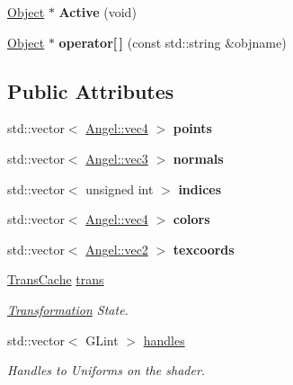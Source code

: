 \begin{DoxyCompactItemize}
\item 
\hypertarget{class_scene_a50f6c9e9aa2e243da5e86bf3470c809e}{\hyperlink{class_object}{Object} $\ast$ {\bfseries Active} (void)}\label{class_scene_a50f6c9e9aa2e243da5e86bf3470c809e}

\item 
\hypertarget{class_scene_ae9b69d8db8a46991017635f22e45baad}{\hyperlink{class_object}{Object} $\ast$ {\bfseries operator\mbox{[}$\,$\mbox{]}} (const std\-::string \&objname)}\label{class_scene_ae9b69d8db8a46991017635f22e45baad}

\end{DoxyCompactItemize}
\subsection*{Public Attributes}
\begin{DoxyCompactItemize}
\item 
\hypertarget{class_object_a8dec70177d147f59ba10c9eba8e9191b}{std\-::vector$<$ \hyperlink{struct_angel_1_1vec4}{Angel\-::vec4} $>$ {\bfseries points}}\label{class_object_a8dec70177d147f59ba10c9eba8e9191b}

\item 
\hypertarget{class_object_ad541a7bb180e24f59d752cc6d7f8c7e8}{std\-::vector$<$ \hyperlink{struct_angel_1_1vec3}{Angel\-::vec3} $>$ {\bfseries normals}}\label{class_object_ad541a7bb180e24f59d752cc6d7f8c7e8}

\item 
\hypertarget{class_object_a9b2fb19d129ad79407f9af0eea05b96c}{std\-::vector$<$ unsigned int $>$ {\bfseries indices}}\label{class_object_a9b2fb19d129ad79407f9af0eea05b96c}

\item 
\hypertarget{class_object_a4de4c1e2c4b621efb6f5d1b398ac6835}{std\-::vector$<$ \hyperlink{struct_angel_1_1vec4}{Angel\-::vec4} $>$ {\bfseries colors}}\label{class_object_a4de4c1e2c4b621efb6f5d1b398ac6835}

\item 
\hypertarget{class_object_a6d6c58ccb93f7a2bd7439d081134aaa0}{std\-::vector$<$ \hyperlink{struct_angel_1_1vec2}{Angel\-::vec2} $>$ {\bfseries texcoords}}\label{class_object_a6d6c58ccb93f7a2bd7439d081134aaa0}

\item 
\hypertarget{class_object_a1bb011587e4fa6e69984d5679546b1cb}{\hyperlink{class_trans_cache}{Trans\-Cache} \hyperlink{class_object_a1bb011587e4fa6e69984d5679546b1cb}{trans}}\label{class_object_a1bb011587e4fa6e69984d5679546b1cb}

\begin{DoxyCompactList}\small\item\em \hyperlink{class_transformation}{Transformation} State. \end{DoxyCompactList}\item 
std\-::vector$<$ G\-Lint $>$ \hyperlink{class_object_acd6c7021617ea334915a1525f9519bc5}{handles}
\begin{DoxyCompactList}\small\item\em Handles to Uniforms on the shader. \end{DoxyCompactList}\end{DoxyCompactItemize}
